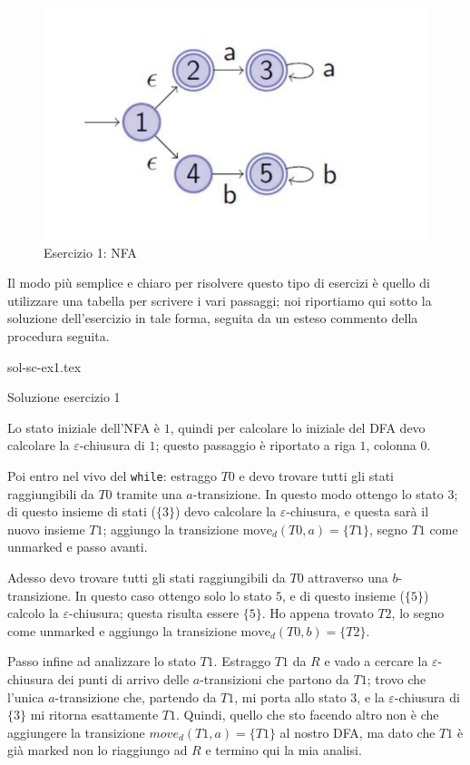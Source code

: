 \documentclass[class=book, crop=false, oneside, 12pt]{standalone}
\begin{document}
\begin{figure}[H]
    \centering
    \includegraphics[width=.7\textwidth,keepaspectratio]{e1_subset_construction.jpg}
    \caption{Esercizio 1: NFA}
    \label{es_sc_1}
\end{figure}

Il modo più semplice e chiaro per risolvere questo tipo di esercizi è quello di utilizzare una tabella per scrivere i vari passaggi; noi riportiamo qui sotto la soluzione dell'esercizio in tale forma, seguita da un esteso commento della procedura seguita.
\begin{table}[H]
	\centering
	{sol-sc-ex1.tex}
    \caption{Soluzione esercizio 1}
    \label{sol-sc-ex1}
\end{table} 
Lo stato iniziale dell'NFA è \(1\), quindi per calcolare lo iniziale del DFA devo calcolare la \(\varepsilon\)-chiusura di \(1\); questo passaggio è riportato a riga \(1\), colonna \(0\).

Poi entro nel vivo del \texttt{while}: estraggo \(T0\) e devo trovare tutti gli stati raggiungibili da \(T0\) tramite una \(a\)-transizione. In questo modo ottengo lo stato \(3\); di questo insieme di stati (\(\{3\}\)) devo calcolare la \(\varepsilon\)-chiusura, e questa sarà il nuovo insieme \(T1\); aggiungo la transizione \(\textrm{move}_d(T0, a)=\{T1\}\), segno \(T1\) come unmarked e passo avanti.

Adesso devo trovare tutti gli stati raggiungibili da \(T0\) attraverso una \(b\)-transizione. In questo caso ottengo solo lo stato \(5\), e di questo insieme (\(\{5\}\)) calcolo la \(\varepsilon\)-chiusura; questa risulta essere \(\{5\}\). Ho appena trovato \(T2\), lo segno come unmarked e aggiungo la transizione \(\textrm{move}_d(T0, b)=\{T2\}\).

Passo infine ad analizzare lo stato \(T1\). Estraggo \(T1\) da \(R\) e vado a cercare la \(\varepsilon\)-chiusura dei punti di arrivo delle \(a\)-transizioni che partono da \(T1\); trovo che l'unica \(a\)-transizione che, partendo da \(T1\), mi porta allo stato \(3\), e la \(\varepsilon\)-chiusura di \(\{3\}\) mi ritorna esattamente \(T1\). Quindi, quello che sto facendo altro non è che aggiungere la transizione \(move_d(T1, a)=\{T1\}\) al nostro DFA, ma dato che \(T1\) è già marked non lo riaggiungo ad \(R\) e termino qui la mia analisi.
\end{document}
